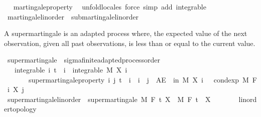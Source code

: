 \begin{isabellebody}
\isadelimproof
\ %
\endisadelimproof
%
\isatagproof
{}\isamarkupfalse%
\ martingale{\isacharunderscore}{\kern0pt}property\ \isamarkupfalse%
\ {\isacharparenleft}{\kern0pt}unfold{\isacharunderscore}{\kern0pt}locales{\isacharparenright}{\kern0pt}\ {\isacharparenleft}{\kern0pt}force\ simp\ add{\isacharcolon}{\kern0pt}\ integrable{\isacharparenright}{\kern0pt}{\isacharplus}{\kern0pt}%
\endisatagproof
{\isafoldproof}%
%
\isadelimproof
%
\endisadelimproof
\isanewline
{}\isamarkupfalse%
\ martingale{\isacharunderscore}{\kern0pt}linorder\ {\isasymsubseteq}\ submartingale{\isacharunderscore}{\kern0pt}linorder%
\isadelimproof
\ %
\endisadelimproof
%
\isatagproof
\isacommand{{\isachardot}{\kern0pt}{\isachardot}{\kern0pt}}\isamarkupfalse%
%
\endisatagproof
{\isafoldproof}%
%
\isadelimproof
%
\endisadelimproof
%
\isadelimdocument
%
\endisadelimdocument
%
\isatagdocument
%
\isamarkuptrue%
%
\endisatagdocument
{\isafolddocument}%
%
\isadelimdocument
%
\endisadelimdocument
%
\begin{isamarkuptext}%
A supermartingale is an adapted process where, the expected value of the next observation, given all past observations, is less than or equal to the current value.%
\end{isamarkuptext}\isamarkuptrue%
\isamarkupfalse%
\ supermartingale\ {\isacharequal}{\kern0pt}\ sigma{\isacharunderscore}{\kern0pt}finite{\isacharunderscore}{\kern0pt}adapted{\isacharunderscore}{\kern0pt}process{\isacharunderscore}{\kern0pt}order\ {\isacharplus}{\kern0pt}\isanewline
\ \ \ integrable{\isacharcolon}{\kern0pt}\ {\isachardoublequoteopen}{\isasymAnd}i{\isachardot}{\kern0pt}\ t\ {\isasymle}\ i\ {\isasymLongrightarrow}\ integrable\ M\ {\isacharparenleft}{\kern0pt}X\ i{\isacharparenright}{\kern0pt}{\isachardoublequoteclose}\isanewline
\ \ \ \ \ \ \ supermartingale{\isacharunderscore}{\kern0pt}property{\isacharcolon}{\kern0pt}\ {\isachardoublequoteopen}{\isasymAnd}i\ j{\isachardot}{\kern0pt}\ t\ {\isasymle}\ i\ {\isasymLongrightarrow}\ i\ {\isasymle}\ j\ {\isasymLongrightarrow}\ AE\ {\isasymxi}\ in\ M{\isachardot}{\kern0pt}\ X\ i\ {\isasymxi}\ {\isasymge}\ cond{\isacharunderscore}{\kern0pt}exp\ M\ {\isacharparenleft}{\kern0pt}F\ i{\isacharparenright}{\kern0pt}\ {\isacharparenleft}{\kern0pt}X\ j{\isacharparenright}{\kern0pt}\ {\isasymxi}{\isachardoublequoteclose}\isanewline
\isanewline
{}\isamarkupfalse%
\ supermartingale{\isacharunderscore}{\kern0pt}linorder\ {\isacharequal}{\kern0pt}\ supermartingale\ M\ F\ t\ X\ \ M\ F\ t\ \ X\ {\isacharcolon}{\kern0pt}{\isacharcolon}{\kern0pt}\ {\isachardoublequoteopen}{\isacharunderscore}{\kern0pt}\ {\isasymRightarrow}\ {\isacharunderscore}{\kern0pt}\ {\isasymRightarrow}\ {\isacharunderscore}{\kern0pt}\ {\isacharcolon}{\kern0pt}{\isacharcolon}{\kern0pt}\ {\isacharbraceleft}{\kern0pt}linorder{\isacharunderscore}{\kern0pt}topology{\isacharbraceright}{\kern0pt}{\isachardoublequoteclose}\isanewline

\end{isabellebody}
